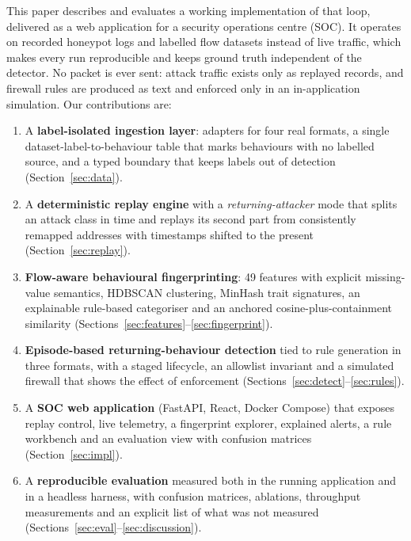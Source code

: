 \documentclass[conference]{IEEEtran}
\begin{document}
This paper describes and evaluates a working implementation of that loop, delivered as a web application for a security operations centre (SOC). It operates on recorded honeypot logs and labelled flow datasets instead of live traffic, which makes every run reproducible and keeps ground truth independent of the detector. No packet is ever sent: attack traffic exists only as replayed records, and firewall rules are produced as text and enforced only in an in-application simulation. Our contributions are:
\begin{enumerate}
\item A \textbf{label-isolated ingestion layer}: adapters for four real formats, a single dataset-label-to-behaviour table that marks behaviours with no labelled source, and a typed boundary that keeps labels out of detection (Section~\ref{sec:data}).
\item A \textbf{deterministic replay engine} with a \emph{returning-attacker} mode that splits an attack class in time and replays its second part from consistently remapped addresses with timestamps shifted to the present (Section~\ref{sec:replay}).
\item \textbf{Flow-aware behavioural fingerprinting}: 49 features with explicit missing-value semantics, HDBSCAN clustering, MinHash trait signatures, an explainable rule-based categoriser and an anchored cosine-plus-containment similarity (Sections~\ref{sec:features}--\ref{sec:fingerprint}).
\item \textbf{Episode-based returning-behaviour detection} tied to rule generation in three formats, with a staged lifecycle, an allowlist invariant and a simulated firewall that shows the effect of enforcement (Sections~\ref{sec:detect}--\ref{sec:rules}).
\item A \textbf{SOC web application} (FastAPI, React, Docker Compose) that exposes replay control, live telemetry, a fingerprint explorer, explained alerts, a rule workbench and an evaluation view with confusion matrices (Section~\ref{sec:impl}).
\item A \textbf{reproducible evaluation} measured both in the running application and in a headless harness, with confusion matrices, ablations, throughput measurements and an explicit list of what was not measured (Sections~\ref{sec:eval}--\ref{sec:discussion}).
\end{enumerate}
\end{document}
